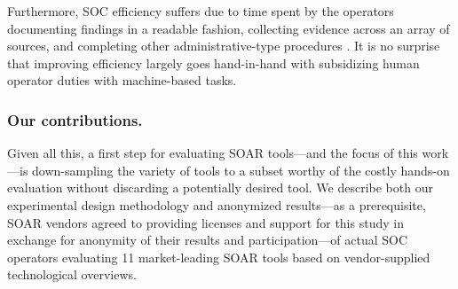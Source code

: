 Furthermore, SOC efficiency suffers due to time spent by the operators documenting findings in a readable fashion, collecting evidence across an array of sources, and completing other administrative-type procedures \citep{BREWER20198}. It is no surprise that improving efficiency largely goes hand-in-hand with subsidizing human operator duties with machine-based tasks.

\subsubsection{Our contributions.}
Given all this, a first step for evaluating SOAR tools---and the focus of this work---is down-sampling the variety of tools to a subset worthy of the costly hands-on evaluation without discarding a potentially desired tool. 
We describe both our experimental design methodology and anonymized results---as a prerequisite, SOAR vendors agreed to providing licenses and support for this study in exchange for anonymity of their results and participation---of actual SOC operators evaluating 11 market-leading SOAR tools based on vendor-supplied technological overviews. 

